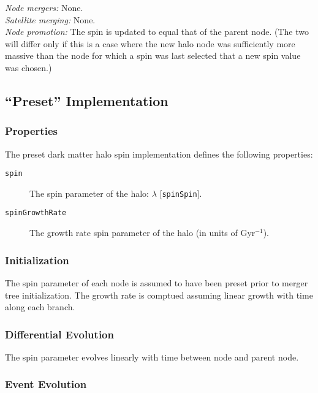 \noindent\emph{Node mergers:} None.\\

\noindent\emph{Satellite merging:} None.\\

\noindent\emph{Node promotion:} The spin is updated to equal that of the parent node. (The two will differ only if this is a case where the new halo \gls{node} was sufficiently more massive than the \gls{node} for which a spin was last selected that a new spin value was chosen.)\\

\subsection{``Preset'' Implementation}

\subsubsection{Properties}

The preset dark matter halo spin implementation defines the following properties:
\begin{description}
 \item [{\tt spin}] The spin parameter of the halo: $\lambda$ [{\tt spinSpin}].
 \item [{\tt spinGrowthRate}] The growth rate spin parameter of the halo (in units of Gyr$^{-1}$).
\end{description}

\subsubsection{Initialization}

The spin parameter of each \gls{node} is assumed to have been preset prior to merger tree initialization. The growth rate is comptued assuming linear growth with time along each branch.

\subsubsection{Differential Evolution}

The spin parameter evolves linearly with time between \gls{node} and parent node.

\subsubsection{Event Evolution}

